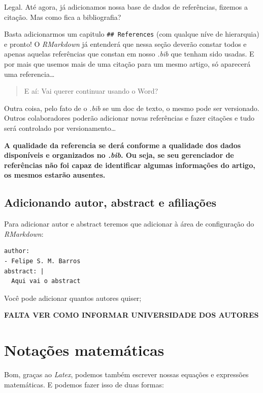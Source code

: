 \documentclass[]{book}
\begin{document}
Legal. Até agora, já adicionamos nossa base de dados de referências, fizemos a citação. Mas como fica a bibliografia?

Basta adicionarmos um capitulo \texttt{\#\#\ References} (com qualque níve de hierarquia) e pronto! O \emph{RMarkdown} já entenderá que nessa seção deverão constar todos e apenas aquelas referências que constan em nosso \emph{.bib} que tenham sido usadas. E por mais que usemos mais de uma citação para um mesmo artigo, só aparecerá uma referencia\ldots{}

\begin{quote}
E aí: Vai querer continuar usando o Word?
\end{quote}

Outra coisa, pelo fato de o \emph{.bib} se um doc de texto, o mesmo pode ser versionado. Outros colaboradores poderão adicionar novas referências e fazer citações e tudo será controlado por versionamento\ldots{}

\textbf{A qualidade da referencia se derá conforme a qualidade dos dados disponíveis e organizados no \emph{.bib}. Ou seja, se seu gerenciador de referências não foi capaz de identificar algumas informações do artigo, os mesmos estarão ausentes.}

\hypertarget{adicionando-autor-abstract-e-afiliauxe7uxf5es}{%
\section{Adicionando autor, abstract e afiliações}\label{adicionando-autor-abstract-e-afiliauxe7uxf5es}}

Para adicionar autor e abstract teremos que adicionar à área de configuração do \emph{RMarkdown}:

\begin{verbatim}
author:
- Felipe S. M. Barros
abstract: |
  Aqui vai o abstract
\end{verbatim}

Você pode adicionar quantos autores quiser;

\textbf{FALTA VER COMO INFORMAR UNIVERSIDADE DOS AUTORES}

\hypertarget{notauxe7uxf5es-matemuxe1ticas}{%
\chapter{Notações matemáticas}\label{notauxe7uxf5es-matemuxe1ticas}}

Bom, graças ao \emph{Latex}, podemos também escrever nossas equações e expressões matemáticas. E podemos fazer isso de duas formas:
\end{document}
